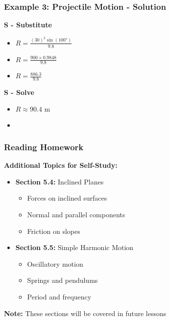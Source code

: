 \documentclass{beamer}
\begin{document}
\begin{frame}
\frametitle{Example 3: Projectile Motion - Solution}
\textbf{S - Substitute}
\begin{itemize}
\item $R = \frac{(30)^2 \sin(100°)}{9.8}$ \pause
\item $R = \frac{900 \times 0.9848}{9.8}$ \pause
\item $R = \frac{886.3}{9.8}$
\end{itemize}
\pause

\textbf{S - Solve}
\begin{itemize}
\item $R \approx 90.4$ m
\item {}
\end{itemize}
\end{frame}
\begin{frame}
\frametitle{Reading Homework}
\textbf{Additional Topics for Self-Study:}
\pause
\begin{itemize}
    \item \textbf{Section 5.4:} Inclined Planes \pause
    \begin{itemize}
        \item Forces on inclined surfaces
        \item Normal and parallel components
        \item Friction on slopes
    \end{itemize}
    \pause
    \item \textbf{Section 5.5:} Simple Harmonic Motion \pause
    \begin{itemize}
        \item Oscillatory motion
        \item Springs and pendulums
        \item Period and frequency
    \end{itemize}
\end{itemize}
\pause
\vspace{0.3cm}
\textbf{Note:} These sections will be covered in future lessons
\end{frame}
\end{document}
